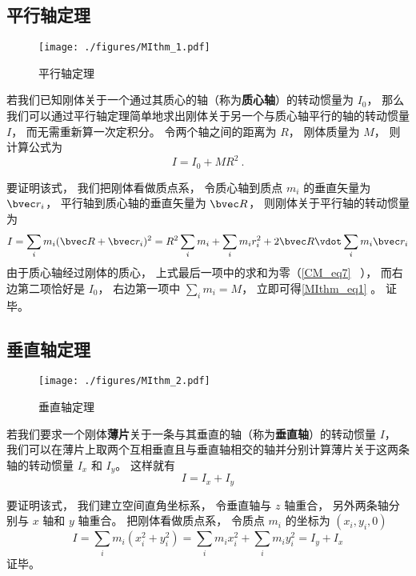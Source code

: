 

\subsection{平行轴定理}
\begin{figure}[ht]
\centering
\texttt{[image: ./figures/MIthm\_1.pdf]}
\caption{平行轴定理} \label{MIthm_fig1}
\end{figure}

若我们已知刚体关于一个通过其质心的轴（称为\textbf{质心轴}）的转动惯量为 $I_0$， 那么我们可以通过平行轴定理简单地求出刚体关于另一个与质心轴平行的轴的转动惯量 $I$， 而无需重新算一次定积分。 令两个轴之间的距离为 $R$， 刚体质量为 $M$， 则计算公式为%
\begin{equation}\label{MIthm_eq1}
I = I_0 + MR^2~.
\end{equation}

要证明该式， 我们把刚体看做质点系， 令质心轴到质点 $m_i$ 的垂直矢量为 $\bvec r_i$， 平行轴到质心轴的垂直矢量为 $\bvec R$， 则刚体关于平行轴的转动惯量为
\begin{equation}
I = \sum_i m_i (\bvec R + \bvec r_i)^2 = R^2\sum_i m_i + \sum_i m_i r_i^2 + 2\bvec R \vdot \sum_i m_i \bvec r_i
\end{equation}
由于质心轴经过刚体的质心， 上式最后一项中的求和为零（\autoref{CM_eq7}~ ）， 而右边第二项恰好是 $I_0$， 右边第一项中 $\sum_i m_i = M$， 立即可得\autoref{MIthm_eq1} 。 证毕。


\subsection{垂直轴定理}
\begin{figure}[ht]
\centering
\texttt{[image: ./figures/MIthm\_2.pdf]}
\caption{垂直轴定理} \label{MIthm_fig2}
\end{figure}
若我们要求一个刚体\textbf{薄片}关于一条与其垂直的轴（称为\textbf{垂直轴}）的转动惯量 $I$， 我们可以在薄片上取两个互相垂直且与垂直轴相交的轴并分别计算薄片关于这两条轴的转动惯量 $I_x$ 和 $I_y$。 这样就有
\begin{equation}\label{MIthm_eq2}
I = I_x + I_y
\end{equation}

要证明该式， 我们建立空间直角坐标系， 令垂直轴与 $z$ 轴重合， 另外两条轴分别与 $x$ 轴和 $y$ 轴重合。 把刚体看做质点系， 令质点 $m_i$ 的坐标为 $(x_i, y_i, 0)$
\begin{equation}
I = \sum_i m_i (x_i^2 + y_i^2) = \sum_i m_i x_i^2 + \sum_i m_i y_i^2 = I_y + I_x
\end{equation}
证毕。

